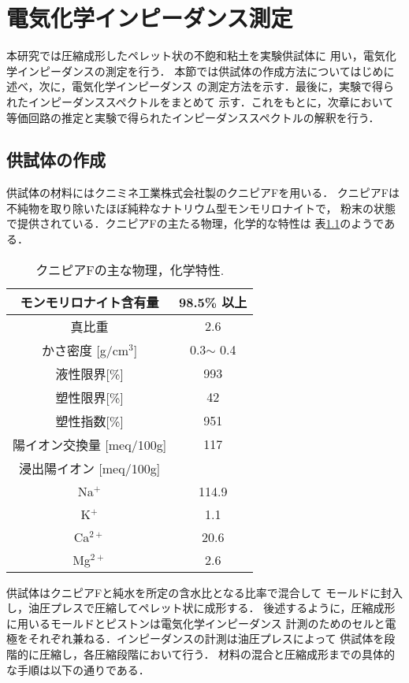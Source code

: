\chapter{電気化学インピーダンス測定}
本研究では圧縮成形したペレット状の不飽和粘土を実験供試体に
用い，電気化学インピーダンスの測定を行う．
本節では供試体の作成方法についてはじめに述べ，次に，電気化学インピーダンス
の測定方法を示す．最後に，実験で得られたインピーダンススペクトルをまとめて
示す．これをもとに，次章において等価回路の推定と実験で得られたインピーダンススペクトルの解釈を行う．
\section{供試体の作成}
供試体の材料にはクニミネ工業株式会社製のクニピアFを用いる．
クニピアFは不純物を取り除いたほぼ純粋なナトリウム型モンモリロナイトで，
粉末の状態で提供されている．クニピアFの主たる物理，化学的な特性は
表\ref{tbl:kunipia}のようである．
\begin{table}[h]
\begin{center}
\caption{クニピアFの主な物理，化学特性.}
\begin{tabular}{|c||c|}
	\hline
	モンモリロナイト含有量 & 98.5\% 以上\\
	\hline
	真比重 & 2.6 \\
	\hline
	かさ密度 [g/cm$^3$]& 0.3$\sim$ 0.4 \\
	\hline 
	液性限界[\%] & 993 \\
	\hline 
	塑性限界[\%] & 42 \\
	\hline 
	塑性指数[\%] & 951 \\
	\hline 
	陽イオン交換量 [meq/100g] &  117\\
	\hline 
	浸出陽イオン [meq/100g] &  \\
	\hline 
	Na$^+$ & 114.9\\
	\hline 
	K$^+$ & 1.1\\
	\hline 
	Ca$^{2+}$ & 20.6\\
	\hline 
	Mg$^{2+}$ & 2.6 \\
	\hline 
\end{tabular}
\label{tbl:kunipia}
\end{center}
\end{table}
供試体はクニピアFと純水を所定の含水比となる比率で混合して
モールドに封入し，油圧プレスで圧縮してペレット状に成形する．
後述するように，圧縮成形に用いるモールドとピストンは電気化学インピーダンス
計測のためのセルと電極をそれぞれ兼ねる．インピーダンスの計測は油圧プレスによって
供試体を段階的に圧縮し，各圧縮段階において行う．
材料の混合と圧縮成形までの具体的な手順は以下の通りである．
